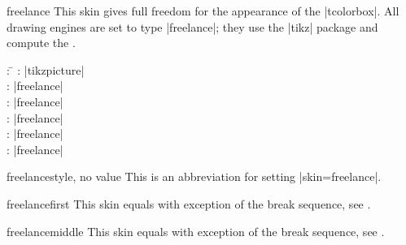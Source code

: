 \begin{docSkin}{freelance}
  This skin gives full freedom for the appearance of the |tcolorbox|.
  All drawing engines are set to type |freelance|; they use the |tikz| package
  and compute the .
\begin{tcolorbox}[skintable=freelance]
  \begin{tabbing}
    : \=\kill
    :  \> |tikzpicture|\\ 
    :           \> |freelance|\\
    : \> |freelance|\\ 
    :        \> |freelance|\\
    :    \> |freelance|\\
    :           \> |freelance|
  \end{tabbing}
\end{tcolorbox}
\end{docSkin}

\begin{docTcbKey}{freelance}{}{style, no value}
  This is an abbreviation for setting |skin=freelance|.
\end{docTcbKey}

\begin{docSkin}{freelancefirst}
  This skin equals  with exception of the break sequence,
  see .
\end{docSkin}

\begin{docSkin}{freelancemiddle}
  This skin equals  with exception of the break sequence,
  see .
\end{docSkin}

